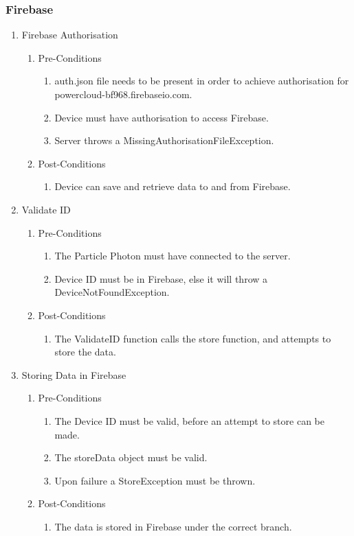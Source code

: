 \documentclass{article}
\begin{document}
	\subsubsection{Firebase}
	\begin{enumerate}
		\item	Firebase Authorisation
	\begin{enumerate}
		\item  Pre-Conditions
		\begin{enumerate}
			\item	auth.json file needs to be present in order to achieve authorisation for powercloud-bf968.firebaseio.com.
			\item	Device must have authorisation to access Firebase.
			\item	Server throws a MissingAuthorisationFileException.
		\end{enumerate}
		\item  Post-Conditions		
		\begin{enumerate}
			\item	Device can save and retrieve data to and from Firebase.
		\end{enumerate}
	\end{enumerate}
	\item Validate ID
	\begin{enumerate}
		\item  Pre-Conditions
		\begin{enumerate}
			\item	The Particle Photon must have connected to the server.
			\item	Device ID must be in Firebase, else it will throw a DeviceNotFoundException.
		\end{enumerate}
		\item  Post-Conditions		
		\begin{enumerate}
			\item	The ValidateID function calls the store function, and attempts to store the data.
		\end{enumerate}
	\end{enumerate}
	\item	Storing Data in Firebase
	\begin{enumerate}
		\item  Pre-Conditions
		\begin{enumerate}
			\item	The Device ID must be valid, before an attempt to store can be made.
			\item	The storeData object must be valid.
			\item	Upon failure a StoreException must be thrown.
		\end{enumerate}
		\item  Post-Conditions		
		\begin{enumerate}
			\item	The data is stored in Firebase under the correct branch.
		\end{enumerate}
	\end{enumerate}
\end{enumerate}
\end{document}
